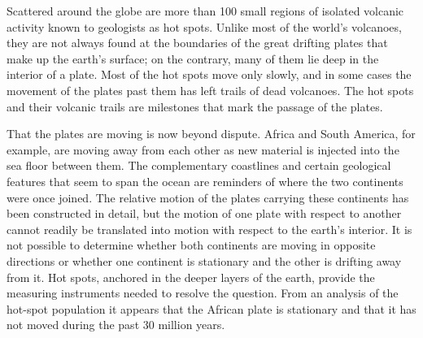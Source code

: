 \documentclass[a4paper]{article}
\begin{document}
\par
Scattered around the globe are more than 100 small regions of isolated volcanic activity known to geologists as hot spots. Unlike most of the world’s volcanoes, they are not always found at the boundaries of the great drifting plates that make up the earth’s surface; on the contrary, many of them lie deep in the interior of a plate. Most of the hot spots move only slowly, and in some cases the movement of the plates past them has left trails of dead volcanoes. The hot spots and their volcanic trails are milestones that mark the passage of the plates.

\par
That the plates are moving is now beyond dispute. Africa and South America, for example, are moving away from each other as new material is injected into the sea floor between them. The complementary coastlines and certain geological features that seem to span the ocean are reminders of where the two continents were once joined. The relative motion of the plates carrying these continents has been constructed in detail, but the motion of one plate with respect to another cannot readily be translated into motion with respect to the earth’s interior. It is not possible to determine whether both continents are moving in opposite directions or whether one continent is stationary and the other is drifting away from it. Hot spots, anchored in the deeper layers of the earth, provide the measuring instruments needed to resolve the question. From an analysis of the hot-spot population it appears that the African plate is stationary and that it has not moved during the past 30 million years.
\end{document}
